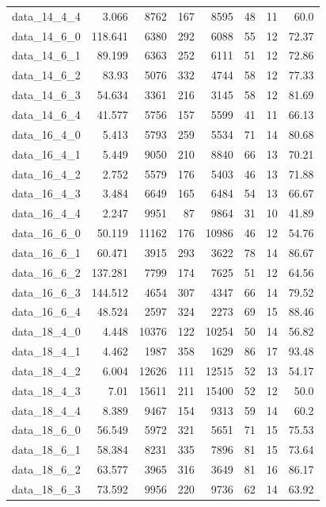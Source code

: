 \documentclass[preprint,12pt,authoryear]{elsarticle}
\begin{document}
\begin{table}[h!]
{\begin{tabular}{rrrrrrrr}
  data\_14\_4\_4 & 3.066 & 8762 & 167 & 8595 & 48 & 11 & 60.0 \\
  data\_14\_6\_0 & 118.641 & 6380 & 292 & 6088 & 55 & 12 & 72.37 \\
  data\_14\_6\_1 & 89.199 & 6363 & 252 & 6111 & 51 & 12 & 72.86 \\
  data\_14\_6\_2 & 83.93 & 5076 & 332 & 4744 & 58 & 12 & 77.33 \\
  data\_14\_6\_3 & 54.634 & 3361 & 216 & 3145 & 58 & 12 & 81.69 \\
  data\_14\_6\_4 & 41.577 & 5756 & 157 & 5599 & 41 & 11 & 66.13 \\
  data\_16\_4\_0 & 5.413 & 5793 & 259 & 5534 & 71 & 14 & 80.68 \\
  data\_16\_4\_1 & 5.449 & 9050 & 210 & 8840 & 66 & 13 & 70.21 \\
  data\_16\_4\_2 & 2.752 & 5579 & 176 & 5403 & 46 & 13 & 71.88 \\
  data\_16\_4\_3 & 3.484 & 6649 & 165 & 6484 & 54 & 13 & 66.67 \\
  data\_16\_4\_4 & 2.247 & 9951 & 87 & 9864 & 31 & 10 & 41.89 \\
  data\_16\_6\_0 & 50.119 & 11162 & 176 & 10986 & 46 & 12 & 54.76 \\
  data\_16\_6\_1 & 60.471 & 3915 & 293 & 3622 & 78 & 14 & 86.67 \\
  data\_16\_6\_2 & 137.281 & 7799 & 174 & 7625 & 51 & 12 & 64.56 \\
  data\_16\_6\_3 & 144.512 & 4654 & 307 & 4347 & 66 & 14 & 79.52 \\
  data\_16\_6\_4 & 48.524 & 2597 & 324 & 2273 & 69 & 15 & 88.46 \\
  data\_18\_4\_0 & 4.448 & 10376 & 122 & 10254 & 50 & 14 & 56.82 \\
  data\_18\_4\_1 & 4.462 & 1987 & 358 & 1629 & 86 & 17 & 93.48 \\
  data\_18\_4\_2 & 6.004 & 12626 & 111 & 12515 & 52 & 13 & 54.17 \\
  data\_18\_4\_3 & 7.01 & 15611 & 211 & 15400 & 52 & 12 & 50.0 \\
  data\_18\_4\_4 & 8.389 & 9467 & 154 & 9313 & 59 & 14 & 60.2 \\
  data\_18\_6\_0 & 56.549 & 5972 & 321 & 5651 & 71 & 15 & 75.53 \\
  data\_18\_6\_1 & 58.384 & 8231 & 335 & 7896 & 81 & 15 & 73.64 \\
  data\_18\_6\_2 & 63.577 & 3965 & 316 & 3649 & 81 & 16 & 86.17 \\
  data\_18\_6\_3 & 73.592 & 9956 & 220 & 9736 & 62 & 14 & 63.92 \\

\end{tabular}}
\end{table}
\end{document}
